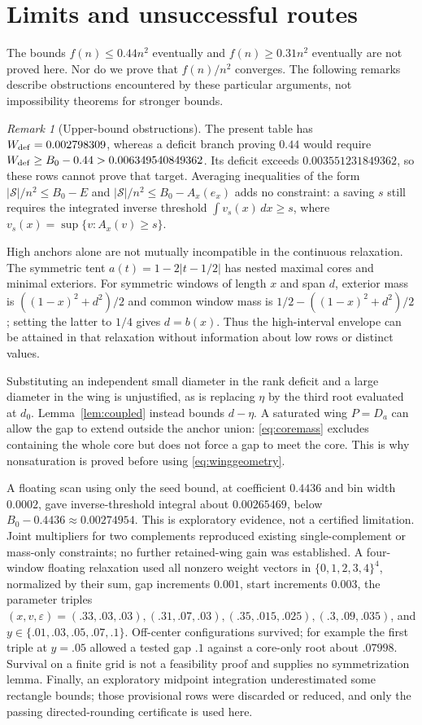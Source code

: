 \documentclass[10pt]{amsart}
\theoremstyle{remark}
\newtheorem{remark}[lemma]{Remark}
\newcommand{\Sset}{\mathcal S}
\begin{document}
\section{Limits and unsuccessful routes}\label{sec:limits}
The bounds $f(n)\le0.44n^2$ eventually and $f(n)\ge0.31n^2$
eventually are not proved here. Nor do we prove that $f(n)/n^2$
converges. The following remarks describe obstructions encountered
by these particular arguments, not impossibility theorems for
stronger bounds.

\begin{remark}[Upper-bound obstructions]
The present table has $W_{\rm def}=0.002798309$, whereas a deficit
branch proving $0.44$ would require
$W_{\rm def}\ge B_0-0.44>0.006349540849362$.
Its deficit exceeds $0.003551231849362$, so these rows cannot prove
that target. Averaging inequalities of the form
$|\Sset|/n^2\le B_0-E$ and $|\Sset|/n^2\le B_0-A_x(e_x)$ adds no
constraint: a saving $s$ still requires the integrated inverse
threshold $\int v_s(x)\,dx\ge s$, where
$v_s(x)=\sup\{v:A_x(v)\ge s\}$.

High anchors alone are not mutually incompatible in the continuous
relaxation. The symmetric tent $a(t)=1-2|t-1/2|$ has nested maximal
cores and minimal exteriors. For symmetric windows of length $x$
and span $d$, exterior mass is $((1-x)^2+d^2)/2$ and common window
mass is $1/2-((1-x)^2+d^2)/2$; setting the latter to $1/4$ gives
$d=b(x)$. Thus the high-interval envelope can be attained in that
relaxation without information about low rows or distinct values.

Substituting an independent small diameter in the rank deficit and
a large diameter in the wing is unjustified, as is replacing
$\eta$ by the third root evaluated at $d_0$. Lemma~\ref{lem:coupled}
instead bounds $d-\eta$. A saturated wing $P=D_a$ can allow the gap
to extend outside the anchor union: \eqref{eq:coremass} excludes
containing the whole core but does not force a gap to meet the core.
This is why nonsaturation is proved before using
\eqref{eq:winggeometry}.

A floating scan using only the seed bound, at coefficient $0.4436$
and bin width $0.0002$, gave inverse-threshold integral about
$0.00265469$, below $B_0-0.4436\approx0.00274954$.
This is exploratory evidence, not a certified limitation.
Joint multipliers for two complements reproduced existing
single-complement or mass-only constraints; no further retained-wing
gain was established. A four-window floating relaxation used all
nonzero weight vectors in $\{0,1,2,3,4\}^4$, normalized by their sum,
gap increments $0.001$, start increments $0.003$, the parameter
triples $(x,v,\varepsilon)=(.33,.03,.03),(.31,.07,.03),
(.35,.015,.025),(.3,.09,.035)$, and
$y\in\{.01,.03,.05,.07,.1\}$. Off-center configurations survived;
for example the first triple at $y=.05$ allowed a tested gap $.1$
against a core-only root about $.07998$. Survival on a finite grid
is not a feasibility proof and supplies no symmetrization lemma.
Finally, an exploratory midpoint integration underestimated some
rectangle bounds; those provisional rows were discarded or reduced,
and only the passing directed-rounding certificate is used here.
\end{remark}
\end{document}
